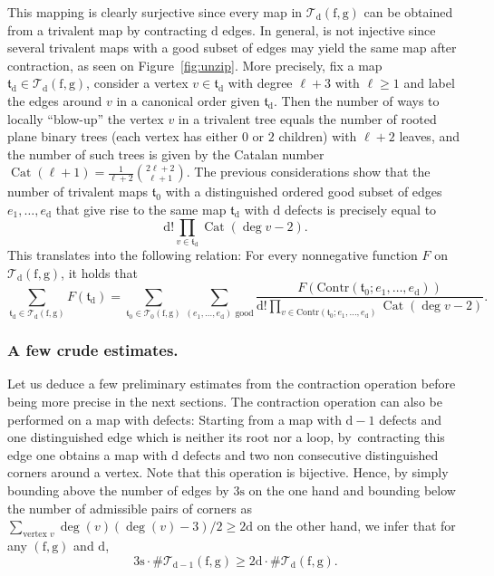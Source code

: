 \documentclass[JEP,XML,SOM,Unicode,NoFloatCountersInSection,NoEqCountersInSection]{cedram}
\DeclareMathOperator{\Cat}{Cat}
\theoremstyle{plain}
\theoremstyle{definition}
\theoremstyle{remark}
\newcommand{\face}{\mathrm{f}}
\newcommand{\defect}{\mathrm{d}}
\newcommand{\gen}{\mathrm{g}}
\newcommand{\spar}{\mathrm{s}}
\begin{document}
This mapping is clearly surjective since every map in $\mathcal{T}_\defect(\face, \gen)$ can be obtained from a trivalent map by contracting $\defect$ edges. In general, is not injective since several trivalent maps with a good subset of edges may yield the same map after contraction, as seen on Figure~\ref{fig:unzip}.
More precisely, fix a map $\mathfrak{t}_\defect \in \mathcal{T}_\defect(\face, \gen)$, consider a vertex $v \in \mathfrak{t}_\defect$ with degree $\ell+3$ with $\ell \geq 1$ and label the edges around $v$ in a canonical order given $\mathfrak{t}_\defect$. Then the number of ways to locally ``blow-up'' the vertex $v$ in a trivalent tree equals the number of rooted plane binary trees (each vertex has either $0$ or $2$ children) with $\ell+2$ leaves, and the number of such trees is given by the Catalan number $\Cat(\ell+1) = \frac{1}{\ell+2} \binom{2\ell+2}{\ell+1}$. The previous considerations show that the number of trivalent maps $\mathfrak{t}_0$ with a distinguished ordered good subset of edges $e_1, \dots, e_\defect$ that give rise to the same map $\mathfrak{t}_\defect$ with $\defect$ defects is precisely equal to\[
\defect! \prod_{v \in \mathfrak{t}_\defect} \Cat(\deg v - 2).
\]
This translates into the following relation: For every nonnegative function $F$ on $\mathcal{T}_\defect(\face, \gen)$, it holds that
\begin{equation}\label{eq:bijection_defauts}
\sum_{\mathfrak{t}_\defect \in \mathcal{T}_\defect(\face, \gen)} F(\mathfrak{t}_\defect)
= \sum_{\mathfrak{t}_0 \in \mathcal{T}_0(\face, \gen)} \sum_{(e_1, \dots, e_\defect) \text{ good}} \frac{F(\mathrm{Contr}(\mathfrak{t}_0 ; e_1, \dots, e_\defect))}{\defect! \prod_{v \in \mathrm{Contr}(\mathfrak{t}_0 ; e_1, \dots, e_\defect)} \Cat(\deg v - 2)}.
\end{equation}

\subsubsection*{A few crude estimates.}
Let us deduce a few preliminary estimates from the contraction operation before being more precise in the next sections.
The contraction operation can also be performed on a map with defects: Starting from a map with $\defect-1$ defects and one distinguished edge which is neither its root nor a loop, by~contracting this edge one obtains a map with $\defect$ defects and two non consecutive distinguished corners around a vertex. Note that this operation is bijective. Hence, by simply bounding above the number of edges by $3\spar$ on the one hand and bounding below the number of admissible pairs of corners as $\sum_{\textrm{vertex } v} \deg(v) (\deg(v)-3) / 2 \ge 2\defect$ on the other hand, we infer that for any $(\face, \gen)$ and $\defect$,
\begin{equation}\label{eq:crude1}
3 \spar \cdot \# \mathcal{T}_{\defect-1}(\face,\gen) \ge 2 \defect \cdot \# \mathcal{T}_{\defect}(\face,\gen).
\end{equation}
\end{document}
